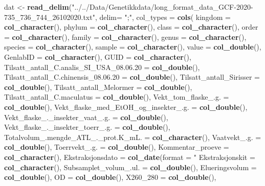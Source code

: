 \documentclass[]{article}
\newenvironment{Shaded}{\begin{snugshade}}{\end{snugshade}}
\newcommand{\DataTypeTok}[1]{\textcolor[rgb]{0.13,0.29,0.53}{#1}}
\newcommand{\KeywordTok}[1]{\textcolor[rgb]{0.13,0.29,0.53}{\textbf{#1}}}
\newcommand{\NormalTok}[1]{#1}
\newcommand{\StringTok}[1]{\textcolor[rgb]{0.31,0.60,0.02}{#1}}
\begin{document}
\begin{Shaded}
\begin{Highlighting}[]
{\NormalTok{dat <-}\StringTok{ }\KeywordTok{read_delim}\NormalTok{(}\StringTok{"../../Data/Genetikkdata/long_format_data_GCF-2020-735_736_744_26102020.txt"}\NormalTok{, }
                  \DataTypeTok{delim=} \StringTok{";"}\NormalTok{,}
                  \DataTypeTok{col_types =} \KeywordTok{cols}\NormalTok{(}
  \DataTypeTok{kingdom =} \KeywordTok{col_character}\NormalTok{(),}
  \DataTypeTok{phylum =} \KeywordTok{col_character}\NormalTok{(),}
  \DataTypeTok{class =} \KeywordTok{col_character}\NormalTok{(),}
  \DataTypeTok{order =} \KeywordTok{col_character}\NormalTok{(),}
  \DataTypeTok{family =} \KeywordTok{col_character}\NormalTok{(),}
  \DataTypeTok{genus =} \KeywordTok{col_character}\NormalTok{(),}
  \DataTypeTok{species =} \KeywordTok{col_character}\NormalTok{(),}
  \DataTypeTok{sample =} \KeywordTok{col_character}\NormalTok{(),}
  \DataTypeTok{value =} \KeywordTok{col_double}\NormalTok{(),}
  \DataTypeTok{GenlabID =} \KeywordTok{col_character}\NormalTok{(),}
  \DataTypeTok{GUID =} \KeywordTok{col_character}\NormalTok{(),}
  \DataTypeTok{Tilsatt_antall_C.analis_SI_USA_08.06.20 =} \KeywordTok{col_double}\NormalTok{(),}
  \DataTypeTok{Tilsatt_antall_C.chinensis_08.06.20 =} \KeywordTok{col_double}\NormalTok{(),}
  \DataTypeTok{Tilsatt_antall_Sirisser =} \KeywordTok{col_double}\NormalTok{(),}
  \DataTypeTok{Tilsatt_antall_Melormer =} \KeywordTok{col_double}\NormalTok{(),}
  \DataTypeTok{Tilsatt_antall_C.maculatus =} \KeywordTok{col_double}\NormalTok{(),}
  \DataTypeTok{Vekt_tom_flaske_.g. =} \KeywordTok{col_double}\NormalTok{(),}
  \DataTypeTok{Vekt_flaske_med_EtOH_og_insekter_.g. =} \KeywordTok{col_double}\NormalTok{(),}
  \DataTypeTok{Vekt_flaske_._insekter_vaat_.g. =} \KeywordTok{col_double}\NormalTok{(),}
  \DataTypeTok{Vekt_flaske_._insekter_toerr_.g. =} \KeywordTok{col_double}\NormalTok{(),}
  \DataTypeTok{Totalvolum_.mengde_ATL_._prot.K_mL. =} \KeywordTok{col_character}\NormalTok{(),}
  \DataTypeTok{Vaatvekt_.g. =} \KeywordTok{col_double}\NormalTok{(),}
  \DataTypeTok{Toerrvekt_.g. =} \KeywordTok{col_double}\NormalTok{(),}
  \DataTypeTok{Kommentar_proeve =} \KeywordTok{col_character}\NormalTok{(),}
  \DataTypeTok{Ekstraksjonsdato =} \KeywordTok{col_date}\NormalTok{(}\DataTypeTok{format =} \StringTok{"%d.%m.%Y"}\NormalTok{),}
  \DataTypeTok{Ekstraksjonskit =} \KeywordTok{col_character}\NormalTok{(),}
  \DataTypeTok{Subsamplet_volum_.ul. =} \KeywordTok{col_double}\NormalTok{(),}
  \DataTypeTok{Elueringsvolum =} \KeywordTok{col_double}\NormalTok{(),}
  \DataTypeTok{OD =} \KeywordTok{col_double}\NormalTok{(),}
  \DataTypeTok{X260_280 =} \KeywordTok{col_double}\NormalTok{(),}
}}
\end{Highlighting}
\end{Shaded}
\end{document}
